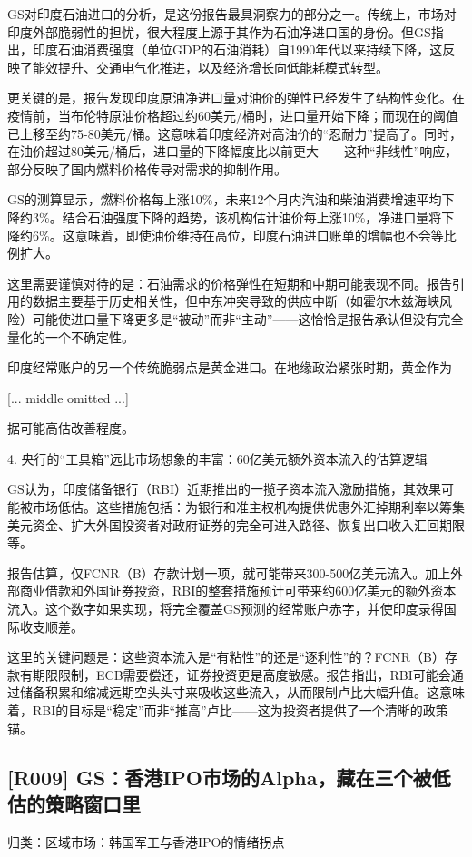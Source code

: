 \documentclass[11pt]{ctexart}
\begin{document}
GS对印度石油进口的分析，是这份报告最具洞察力的部分之一。传统上，市场对印度外部脆弱性的担忧，很大程度上源于其作为石油净进口国的身份。但GS指出，印度石油消费强度（单位GDP的石油消耗）自1990年代以来持续下降，这反映了能效提升、交通电气化推进，以及经济增长向低能耗模式转型。

更关键的是，报告发现印度原油净进口量对油价的弹性已经发生了结构性变化。在疫情前，当布伦特原油价格超过约60美元/桶时，进口量开始下降；而现在的阈值已上移至约75-80美元/桶。这意味着印度经济对高油价的“忍耐力”提高了。同时，在油价超过80美元/桶后，进口量的下降幅度比以前更大——这种“非线性”响应，部分反映了国内燃料价格传导对需求的抑制作用。

GS的测算显示，燃料价格每上涨10\%，未来12个月内汽油和柴油消费增速平均下降约3\%。结合石油强度下降的趋势，该机构估计油价每上涨10\%，净进口量将下降约6\%。这意味着，即使油价维持在高位，印度石油进口账单的增幅也不会等比例扩大。

这里需要谨慎对待的是：石油需求的价格弹性在短期和中期可能表现不同。报告引用的数据主要基于历史相关性，但中东冲突导致的供应中断（如霍尔木兹海峡风险）可能使进口量下降更多是“被动”而非“主动”——这恰恰是报告承认但没有完全量化的一个不确定性。

印度经常账户的另一个传统脆弱点是黄金进口。在地缘政治紧张时期，黄金作为

[... middle omitted ...]

据可能高估改善程度。

4. 央行的“工具箱”远比市场想象的丰富：60亿美元额外资本流入的估算逻辑

GS认为，印度储备银行（RBI）近期推出的一揽子资本流入激励措施，其效果可能被市场低估。这些措施包括：为银行和准主权机构提供优惠外汇掉期利率以筹集美元资金、扩大外国投资者对政府证券的完全可进入路径、恢复出口收入汇回期限等。

报告估算，仅FCNR（B）存款计划一项，就可能带来300-500亿美元流入。加上外部商业借款和外国证券投资，RBI的整套措施预计可带来约600亿美元的额外资本流入。这个数字如果实现，将完全覆盖GS预测的经常账户赤字，并使印度录得国际收支顺差。

这里的关键问题是：这些资本流入是“有粘性”的还是“逐利性”的？FCNR（B）存款有期限限制，ECB需要偿还，证券投资更是高度敏感。报告指出，RBI可能会通过储备积累和缩减远期空头头寸来吸收这些流入，从而限制卢比大幅升值。这意味着，RBI的目标是“稳定”而非“推高”卢比——这为投资者提供了一个清晰的政策锚。

\subsection{[R009] GS：香港IPO市场的Alpha，藏在三个被低估的策略窗口里}
{\small\color{refgray}归类：区域市场：韩国军工与香港IPO的情绪拐点}
\end{document}
